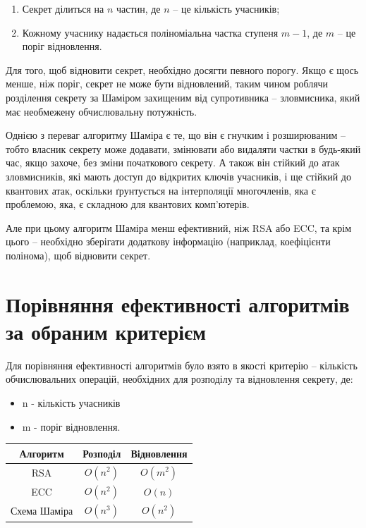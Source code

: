 \begin{enumerate}
    \item Секрет ділиться на $n$ частин, де $n$ -- це кількість учасників;
    \item Кожному учаснику надається поліноміальна частка ступеня $m-1$, де $m$ -- це поріг відновлення.
\end{enumerate}

Для того, щоб відновити секрет, необхідно досягти певного порогу. Якщо є щось менше, ніж поріг, секрет не може бути відновлений, таким чином роблячи розділення секрету за Шаміром захищеним від супротивника -- зловмисника, який має необмежену обчислювальну потужність.

\vspace{0.5cm}
Однією з переваг алгоритму Шаміра є те, що він є гнучким і розширюваним -- тобто власник секрету може додавати, змінювати або видаляти частки в будь-який час, якщо захоче, без зміни початкового секрету. А також він стійкий до атак зловмисників, які мають доступ до відкритих ключів учасників, і ще стійкий до квантових атак, оскільки ґрунтується на інтерполяції многочленів, яка є проблемою, яка, є складною для квантових комп’ютерів.

Але при цьому алгоритм Шаміра менш ефективний, ніж RSA або ECC, та крім цього -- необхідно зберігати додаткову інформацію (наприклад, коефіцієнти полінома), щоб відновити секрет.

\newpage
\section{Порівняння ефективності алгоритмів за обраним критерієм}

Для порівняння ефективності алгоритмів було взято в якості критерію -- кількість обчислювальних операцій, необхідних для розподілу та відновлення секрету, де: 
\vspace{0.25cm}
\begin{itemize}
    \item n - кількість учасників
    \item m - поріг відновлення.
\end{itemize}

\begin{table}[ht]
\centering
\scalebox{1.25} {
\begin{tabular}{|c|c|c|}
\toprule
        \textbf{Алгоритм} & \textbf{Розподіл} & \textbf{Відновлення} \\ \midrule
	RSA & $O(n^2)$ & $O(m^2)$ \\ \cmidrule{1-3}
	ECC & $O(n^2)$ & $O(n)$ \\ \cmidrule{1-3}
        Схема Шаміра & $O(n^3)$ & $O(n^2)$ \\ \bottomrule
\end{tabular}}
\end{table}


